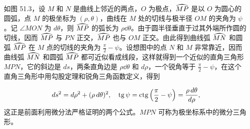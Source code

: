 \begin{minipage}[c]{0.58\textwidth}
  \hspace*{2em}如图 51.3，设 $M$ 和 $N$ 是曲线上邻近的两点，$O$ 为极点，$\arc{MP}$ 是以 $O$ 为圆心的圆弧，点 $M$ 的极坐标为 $(\rho,\theta)$，曲线在 $M$ 处的切线与极半径 $OM$ 的夹角为 $\psi$。记 $\angle MON$ 为 $d\theta$，则 $\arc{MP}$ 的弧长为 $\rho\dd\theta$。由于圆半径垂直于过其外端所作圆的切线，因而 $\arc{MP}$ 与 $PN$ 正交，$\arc{MP}$ 也与 $OM$ 正交。由此得到曲线弧 $\arc{MN}$ 和圆弧 $\arc{MP}$ 在 $M$ 点的切线的夹角为 $\frac{\pi}{2} - \psi$。设想图中的点 $N$ 和 $M$ 非常靠近，因而曲线弧 $\arc{MN}$ 和圆弧 $\arc{MP}$ 都可近似看成线段，这样就得到一个近似的直角三角形 $MPN$，它的斜边是 $ds$，两条直角边是 $\rho\dd\theta$ 和 $d\rho$，一个锐角等于 $\frac{\pi}{2} - \psi$，在这个直角三角形中用勾股定理和锐角三角函数定义，得到
\end{minipage}

\noindent
\[
  ds^2 = d\rho^2 + (\rho\,d\theta)^2,\quad \operatorname{tg}\psi = \operatorname{ctg}\left(\frac{\pi}{2} - \psi\right) = \frac{\rho\,d\theta}{d\rho},
\]
这正是前面利用微分法严格证明的两个公式。$MPN$ 可称为极坐标系中的微分三角形。
